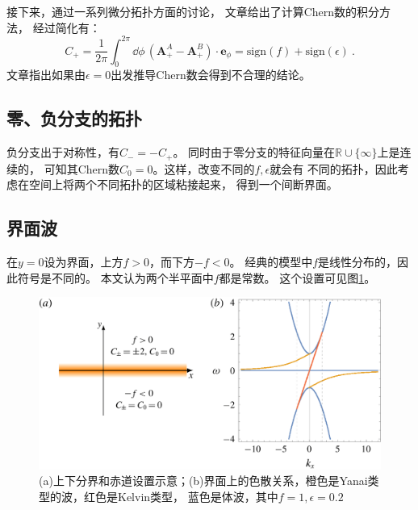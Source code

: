 \documentclass[UTF8,zihao=5]{ctexart} %
\begin{document}
接下来，通过一系列微分拓扑方面的讨论，
文章给出了计算Chern数的积分方法\cite{nakahara2003geometry}，
经过简化有：
\begin{equation}
    C_+ = \dfrac{1}{2\pi} \int_0^{2\pi}  \dd \phi \, (\mathbf A_+^A - \mathbf A_+^B) \cdot  \mathbf e_\phi= \text{sign}(f) + \text{sign}(\epsilon) \ .
\end{equation}
文章指出如果由$\epsilon=0$出发推导Chern数会得到不合理的结论。

\subsection{零、负分支的拓扑}
负分支出于对称性，有$C_-=-C_+$。
同时由于零分支的特征向量在$\mathbb{R} \cup \{\infty\}$上是连续的，
可知其Chern数$C_0=0$。这样，改变不同的$f,\epsilon$就会有
不同的拓扑，因此考虑在空间上将两个不同拓扑的区域粘接起来，
得到一个间断界面。

\subsection{界面波}

在$y=0$设为界面，上方$f>0$，而下方$-f<0$。
经典的模型中$f$是线性分布的，因此符号是不同的。
本文认为两个半平面中$f$都是常数。
这个设置可见图\ref{fig:3}。

\begin{figure}[H]
    \centering
    \includegraphics[width=16cm]{fig3.png}  %
    \caption{(a)上下分界和赤道设置示意；(b)界面上的色散关系，橙色是Yanai类型的波，红色是Kelvin类型，
        蓝色是体波，其中$f=1,\epsilon=0.2$}
    \label{fig:3}
\end{figure}
\end{document}
